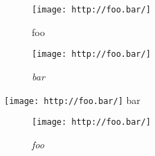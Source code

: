 \begin{figure}[htbp]
\centering
\texttt{[image: http://foo.bar/]}
\caption{foo}
\label{foo}
\end{figure}

\begin{figure}[htbp]
\centering
\texttt{[image: http://foo.bar/]}
\caption{\emph{bar}}
\label{foo}
\end{figure}

\texttt{[image: http://foo.bar/]} bar

\begin{figure}[htbp]
\centering
\texttt{[image: http://foo.bar/]}
\caption{\emph{foo}}
\end{figure}
